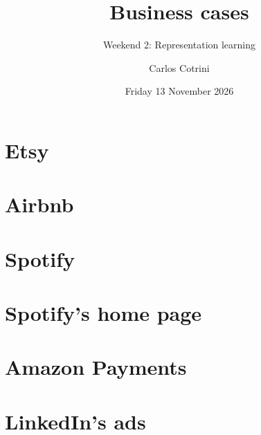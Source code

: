 \documentclass[aspectratio=169]{beamer}
\title{Business cases}
\subtitle{Weekend 2: Representation learning}
\author{Carlos Cotrini}
\institute{AI in Industry, ETH Zurich}
\date{Friday 13 November 2026}
\begin{document}
\begin{frame}
  \titlepage
\end{frame}

\section{Etsy}


\section{Airbnb}


\section{Spotify}


\section{Spotify's home page}


\section{Amazon Payments}


\section{LinkedIn's ads}

\end{document}
